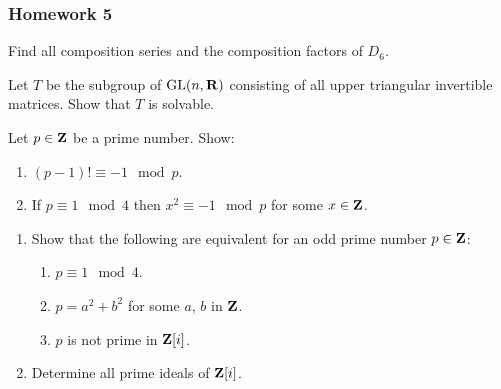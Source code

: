 \subsubsection{Homework 5}
\setcounter{exercise}{0}
\setcounter{equation}{0}

\begin{problem}
  Find all composition series and the composition factors of $D_6$.
\end{problem}
\begin{solution}
\end{solution}

\begin{problem}
  Let $T$ be the subgroup of $\mathrm{GL}(n,\mathbf{R})$ consisting of all upper triangular
  invertible matrices. Show that $T$ is solvable.
\end{problem}
\begin{solution}
\end{solution}

\begin{problem}
  Let $p\in\mathbf{Z}$ be a prime number. Show:
  \begin{enumerate}[label=(\alph*),noitemsep]
  \item $(p-1)!\equiv -1\mod{p}$.
  \item If $p\equiv 1\mod{4}$ then $x^2\equiv-1\mod{p}$ for some
    $x\in\mathbf{Z}$.
  \end{enumerate}
\end{problem}
\begin{solution}
\end{solution}

\begin{problem}
  \begin{enumerate}[label=(\alph*),noitemsep]
  \item Show that the following are equivalent for an odd prime number
    $p\in\mathbf{Z}$:
    \begin{enumerate}[label=(\roman*),noitemsep]
    \item $p\equiv 1\mod 4$.
    \item $p=a^2+b^2$ for some $a$, $b$ in $\mathbf{Z}$.
    \item $p$ is not prime in $\mathbf{Z}[i]$.
    \end{enumerate}
  \item Determine all prime ideals of $\mathbf{Z}[i]$.
  \end{enumerate}
\end{problem}
\begin{solution}
\end{solution}

